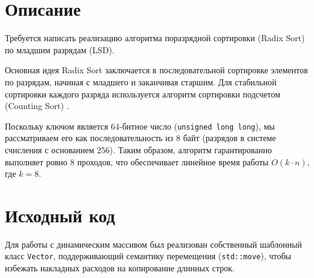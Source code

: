 \section{Описание}
Требуется написать реализацию алгоритма поразрядной сортировки (Radix Sort) по младшим разрядам (LSD). 

Основная идея Radix Sort заключается в последовательной сортировке элементов по разрядам, начиная с младшего и заканчивая старшим. Для стабильной сортировки каждого разряда используется алгоритм сортировки подсчетом (Counting Sort) \cite{Kormen}.

Поскольку ключом является 64-битное число (\texttt{unsigned long long}), мы рассматриваем его как последовательность из 8 байт (разрядов в системе счисления с основанием 256). Таким образом, алгоритм гарантированно выполняет ровно 8 проходов, что обеспечивает линейное время работы $O(k \cdot n)$, где $k=8$.

\pagebreak

\section{Исходный код}
Для работы с динамическим массивом был реализован собственный шаблонный класс \texttt{Vector}, поддерживающий семантику перемещения (\texttt{std::move}), чтобы избежать накладных расходов на копирование длинных строк.

